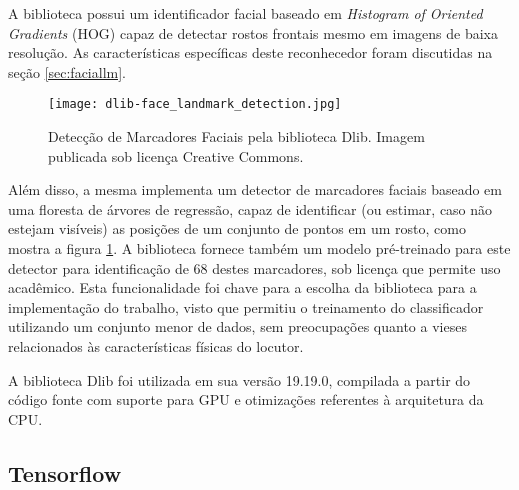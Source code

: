 A biblioteca possui um identificador facial baseado em \textit{Histogram of Oriented Gradients} (HOG) capaz de detectar rostos frontais mesmo em imagens de baixa resolução. As características específicas deste reconhecedor foram discutidas na seção \ref{sec:faciallm}.


\begin{figure}[ht]
    \centering
    \texttt{[image: dlib-face\_landmark\_detection.jpg]}    
    \caption{Detecção de Marcadores Faciais pela biblioteca Dlib. Imagem publicada sob licença Creative Commons\cite{mtheilerDeteccaoMarcadoresFaciais2019}. }
    \label{fig:dlib-landmarking}
\end{figure}

Além disso, a mesma implementa um detector de marcadores faciais baseado em uma floresta de árvores de regressão, capaz de identificar (ou estimar, caso não estejam visíveis) as posições de um conjunto de pontos em um rosto, como mostra a figura \ref{fig:dlib-landmarking}. A biblioteca fornece também um modelo pré-treinado para este detector para identificação de 68 destes marcadores, sob licença que permite uso acadêmico. Esta funcionalidade foi chave para a escolha da biblioteca para a implementação do trabalho, visto que permitiu o treinamento do classificador utilizando um conjunto menor de dados, sem preocupações quanto a vieses relacionados às características físicas do locutor.

A biblioteca Dlib foi utilizada em sua versão 19.19.0, compilada a partir do código fonte com suporte para GPU e otimizações referentes à arquitetura da CPU.

\subsection{Tensorflow}
\label{subsec:tf}

